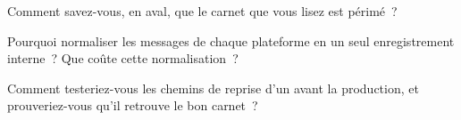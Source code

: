 \begin{interviewq}\label{iq:ll:the-feed-handler:4}
Comment savez-vous, en aval, que le carnet que vous lisez est périmé~?
\end{interviewq}

\begin{interviewq}\label{iq:ll:the-feed-handler:5}
Pourquoi normaliser les messages de chaque plateforme en un seul enregistrement interne~? Que coûte cette normalisation~?
\end{interviewq}

\begin{interviewq}\label{iq:ll:the-feed-handler:6}
Comment testeriez-vous les chemins de reprise d'un  avant la production, et prouveriez-vous qu'il retrouve le bon carnet~?
\end{interviewq}
